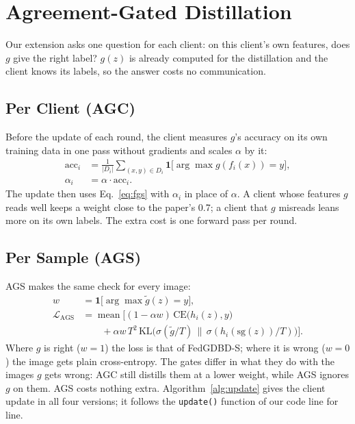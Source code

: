 \documentclass[conference]{IEEEtran}
\begin{document}
\section{Agreement-Gated Distillation}
\label{sec:gates}

Our extension asks one question for each client: on this client's own features, does $g$ give the right label? $g(z)$ is already computed for the distillation and the client knows its labels, so the answer costs no communication.

\subsection{Per Client (AGC)}
Before the update of each round, the client measures $g$'s accuracy on its own training data in one pass without gradients and scales $\alpha$ by it:
\begin{equation}
\begin{split}
\mathrm{acc}_i &= \frac{1}{|D_i|}\sum_{(x,y)\in D_i} \mathbf{1}\big[\arg\max g(f_i(x)) = y\big],\\
\alpha_i &= \alpha\cdot\mathrm{acc}_i.
\end{split}
\label{eq:agc}
\end{equation}
The update then uses Eq.~\eqref{eq:fgs} with $\alpha_i$ in place of $\alpha$. A client whose features $g$ reads well keeps a weight close to the paper's 0.7; a client that $g$ misreads leans more on its own labels. The extra cost is one forward pass per round.

\subsection{Per Sample (AGS)}
AGS makes the same check for every image:
\begin{equation}
\begin{aligned}
w &= \mathbf{1}\big[\arg\max \tilde{g}(z) = y\big],\\
\mathcal{L}_{\text{AGS}} &= \operatorname{mean}\Big[(1-\alpha w)\,\mathrm{CE}\big(h_i(z),y\big)\\
&\qquad + \alpha w\, T^2\,\mathrm{KL}\big(\sigma(\tilde{g}/T)\,\|\,\sigma(h_i(\mathrm{sg}(z))/T)\big)\Big].
\end{aligned}
\label{eq:ags}
\end{equation}
Where $g$ is right ($w=1$) the loss is that of FedGDBD-S; where it is wrong ($w=0$) the image gets plain cross-entropy. The gates differ in what they do with the images $g$ gets wrong: AGC still distills them at a lower weight, while AGS ignores $g$ on them. AGS costs nothing extra. Algorithm~\ref{alg:update} gives the client update in all four versions; it follows the \texttt{update()} function of our code line for line.
\end{document}
